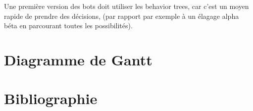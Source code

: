 \documentclass[french]{article}
\begin{document}
Une première version des bots doit utiliser les behavior trees, car c'est un moyen rapide de prendre des décisions, (par rapport par exemple à un élagage alpha béta en parcourant toutes les possibilités). \newline

\section{Diagramme de Gantt}

\section{Bibliographie}


\printbibliography[title={}]
\nocite{*}
\end{document}
